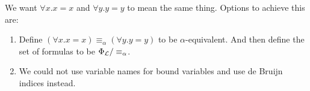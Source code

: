 \begin{rem}
We want $\forall x. x = x$ and $\forall y. y = y$ to mean the same thing. 
Options to achieve this are: 
\begin{enumerate}
    \item Define $(\forall x. x = x) \equiv_{\alpha} (\forall y. y = y)$ to be \alert{$\alpha$-equivalent}. And then define the set of formulas to be $\Phi_{\mathcal{L}} / \equiv_{\alpha}$.
    \item We could not use variable names for bound variables and use \alert{de Bruijn indices} instead.
\end{enumerate}
\end{rem}